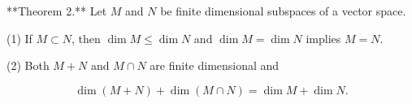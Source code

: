 **Theorem 2.** Let $M$ and $N$ be finite dimensional subspaces of a vector space.

(1) If $M \subset N$, then $\dim M \leq \dim N$ and $\dim M = \dim N$ implies $M = N$.

(2) Both $M + N$ and $M \cap N$ are finite dimensional and

$$\dim (M + N) + \dim (M \cap N) = \dim M + \dim N.$$
